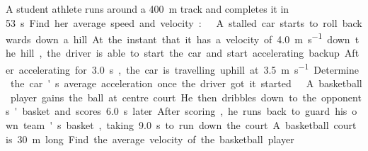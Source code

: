 \documentclass[12pt]{../ossphysics}
\begin{document}
\begin{questions}
  
  \question A student athlete runs around a \SI{400}{\metre} track and
  completes it in \SI{53}\second. Find her average speed and velocity:
  
  \question A stalled car starts to roll backwards down a hill. At the instant
  that it has a velocity of \SI{4.0}{\metre\per\second} down the hill, the
  driver is able to start the car and start accelerating backup. After
  accelerating for \SI{3.0}\second, the car is travelling uphill at
  \SI{3.5}{\metre\per\second}. Determine the car's average acceleration once
  the driver got it started.
  \vspace{\stretch1}

  
  \question A basketball player gains the ball at centre court. He then
  dribbles down to the opponents' basket and scores \SI{6.0}{\second} later.
  After scoring, he runs back to guard his own team's basket, taking
  \SI{9.0}{\second} to run down the court. A basketball court is \SI{30}{\metre}
  long. Find the average velocity of the basketball player
  \newpage
  

\end{questions}
\end{document}
